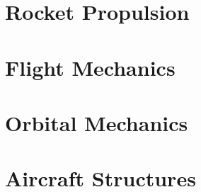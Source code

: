 \documentclass{book}
\begin{document}
\chapter{Rocket Propulsion}



\chapter{Flight Mechanics}



\chapter{Orbital Mechanics}



\chapter{Aircraft Structures}


\end{document}
